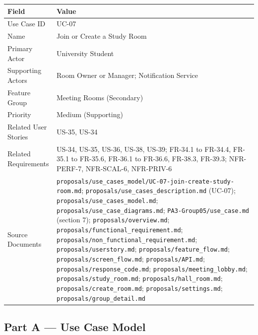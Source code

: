 \documentclass[12pt]{article}
\renewcommand{\baselinestretch}{1.5}
\begin{document}
\begingroup
\small
\renewcommand{\baselinestretch}{1.0}\selectfont
\renewcommand{\arraystretch}{1.15}
\setlength{\tabcolsep}{6pt}
\begin{longtable}{|>{\raggedright\arraybackslash}p{}|>{\raggedright\arraybackslash}p{}|}
\hline
\textbf{Field} & \textbf{Value} \\ \hline
\endhead
Use Case ID & UC-07 \\ \hline
Name & Join or Create a Study Room \\ \hline
Primary Actor & University Student \\ \hline
Supporting Actors & Room Owner or Manager; Notification Service \\ \hline
Feature Group & Meeting Rooms (Secondary) \\ \hline
Priority & Medium (Supporting) \\ \hline
Related User Stories & US-35, US-34 \\ \hline
Related Requirements & US-34, US-35, US-36, US-38, US-39; FR-34.1 to FR-34.4, FR-35.1 to FR-35.6, FR-36.1 to FR-36.6, FR-38.3, FR-39.3; NFR-PERF-7, NFR-SCAL-6, NFR-PRIV-6 \\ \hline
Source Documents & \texttt{proposals/use\_cases\_model/UC-07-join-create-study-room.md}; \texttt{proposals/use\_cases\_description.md} (UC-07); \texttt{proposals/use\_cases\_model.md}; \texttt{proposals/use\_case\_diagrams.md}; \texttt{PA3-Group05/use\_case.md} (section 7); \texttt{proposals/overview.md}; \texttt{proposals/functional\_requirement.md}; \texttt{proposals/non\_functional\_requirement.md}; \texttt{proposals/userstory.md}; \texttt{proposals/feature\_flow.md}; \texttt{proposals/screen\_flow.md}; \texttt{proposals/API.md}; \texttt{proposals/response\_code.md}; \texttt{proposals/meeting\_lobby.md}; \texttt{proposals/study\_room.md}; \texttt{proposals/hall\_room.md}; \texttt{proposals/create\_room.md}; \texttt{proposals/settings.md}; \texttt{proposals/group\_detail.md} \\ \hline
\end{longtable}
\endgroup
\par\medskip

\hypertarget{sec:part-a-use-case-model}{}
\subsection*{Part A --- Use Case Model}
\par\medskip
\end{document}
